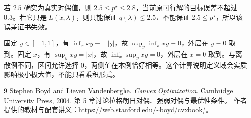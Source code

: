\documentclass[UTF8]{ctexart}
\begin{document}
\begin{solve}
若 $2.5$ 确实为真实对偶值，则 $2.5\leq p^\star\leq2.8$，当前原可行解的目标误差不超过 $0.3$。若它只是 $L(\widetilde x,\lambda)$，则只能保证 $q(\lambda)\leq2.5$，不能保证 $2.5\leq p^\star$，所以该误差证书失效。
\end{solve}

\begin{solve}
固定 $y\in[-1,1]$，有 $\inf_xxy=-|y|$，故 $\sup_y\inf_xxy=0$，外层在 $y=0$ 取到。固定 $x$，有 $\sup_yxy=|x|$，故 $\inf_x\sup_yxy=0$，外层在 $x=0$ 取到。与离散例不同，区间允许选择 $0$，两侧值在本例恰好相等。这个计算说明定义域会实质影响极小极大值，不能只看乘积形式。
\end{solve}

\begin{thebibliography}{9}
Stephen Boyd and Lieven Vandenberghe.
\emph{Convex Optimization}. Cambridge University Press, 2004.
第 5 章讨论拉格朗日对偶、强弱对偶与最优性条件。
作者提供的教材与配套讲义：\url{https://web.stanford.edu/~boyd/cvxbook/}。
\end{thebibliography}
\end{document}
